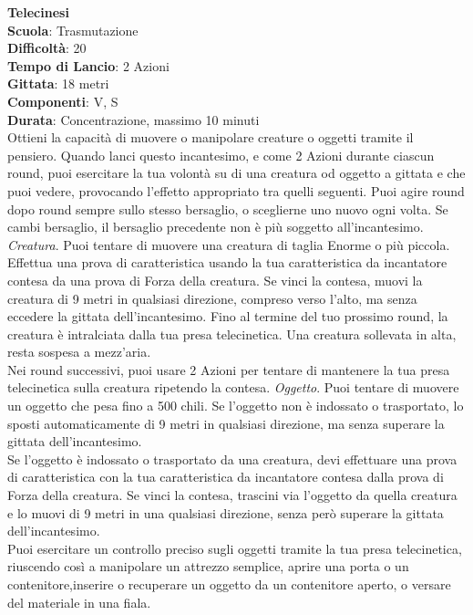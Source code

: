 \begin{multicols}{2}
\medskip\textbf{Telecinesi}\\
\textbf{Scuola}: Trasmutazione\\
\textbf{Difficoltà}: 20\\
\textbf{Tempo di Lancio}: 2 Azioni\\
\textbf{Gittata}: 18 metri\\
\textbf{Componenti}: V, S\\
\textbf{Durata}: Concentrazione, massimo 10 minuti \\
Ottieni la capacità di muovere o manipolare creature o oggetti tramite il pensiero. Quando lanci questo incantesimo, e come 2 Azioni durante ciascun round, puoi esercitare la tua volontà su di una creatura od oggetto a gittata e che puoi vedere, provocando l'effetto appropriato tra quelli seguenti. Puoi agire round dopo round sempre sullo stesso bersaglio, o sceglierne uno nuovo ogni volta. Se cambi bersaglio, il bersaglio precedente non è più soggetto all'incantesimo.
\textit{Creatura}. Puoi tentare di muovere una creatura di taglia Enorme o più piccola. Effettua una prova di caratteristica usando la tua caratteristica da incantatore contesa da una prova di Forza della creatura. Se vinci la contesa, muovi la creatura di 9 metri in qualsiasi direzione, compreso verso l'alto, ma senza eccedere la gittata dell'incantesimo. Fino al termine del tuo prossimo round, la creatura è intralciata dalla tua presa telecinetica. Una creatura sollevata in alta, resta sospesa a mezz'aria.\\
Nei round successivi, puoi usare 2 Azioni per tentare di mantenere la tua presa telecinetica sulla creatura ripetendo la contesa.
\textit{Oggetto}. Puoi tentare di muovere un oggetto che pesa fino a 500 chili. Se l'oggetto non è indossato o trasportato, lo sposti automaticamente di 9 metri in qualsiasi direzione, ma senza superare la gittata dell'incantesimo.\\
Se l'oggetto è indossato o trasportato da una creatura, devi effettuare una prova di caratteristica con la tua caratteristica da incantatore contesa dalla prova di Forza della creatura. Se vinci la contesa, trascini via l'oggetto da quella creatura e lo muovi di 9 metri in una qualsiasi direzione, senza però superare la gittata dell'incantesimo.\\
Puoi esercitare un controllo preciso sugli oggetti tramite la tua presa telecinetica, riuscendo così a manipolare un attrezzo semplice, aprire una porta o un contenitore,inserire o recuperare un oggetto da un contenitore aperto, o versare del materiale in una fiala.


\end{multicols}
